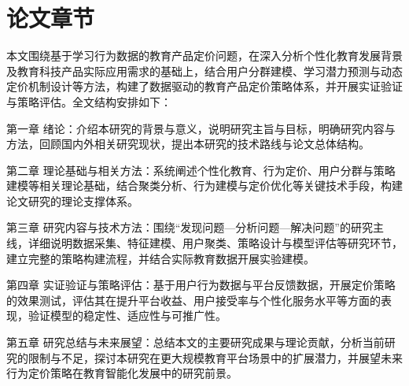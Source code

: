 \section{论文章节}

本文围绕基于学习行为数据的教育产品定价问题，在深入分析个性化教育发展背景及教育科技产品实际应用需求的基础上，结合用户分群建模、学习潜力预测与动态定价机制设计等方法，构建了数据驱动的教育产品定价策略体系，并开展实证验证与策略评估。全文结构安排如下：

第一章 绪论：介绍本研究的背景与意义，说明研究主旨与目标，明确研究内容与方法，回顾国内外相关研究现状，提出本研究的技术路线与论文总体结构。

第二章 理论基础与相关方法：系统阐述个性化教育、行为定价、用户分群与策略建模等相关理论基础，结合聚类分析、行为建模与定价优化等关键技术手段，构建论文研究的理论支撑体系。

第三章 研究内容与技术方法：围绕“发现问题—分析问题—解决问题”的研究主线，详细说明数据采集、特征建模、用户聚类、策略设计与模型评估等研究环节，建立完整的策略构建流程，并结合实际教育数据开展实验建模。

第四章 实证验证与策略评估：基于用户行为数据与平台反馈数据，开展定价策略的效果测试，评估其在提升平台收益、用户接受率与个性化服务水平等方面的表现，验证模型的稳定性、适应性与可推广性。

第五章 研究总结与未来展望：总结本文的主要研究成果与理论贡献，分析当前研究的限制与不足，探讨本研究在更大规模教育平台场景中的扩展潜力，并展望未来行为定价策略在教育智能化发展中的研究前景。


